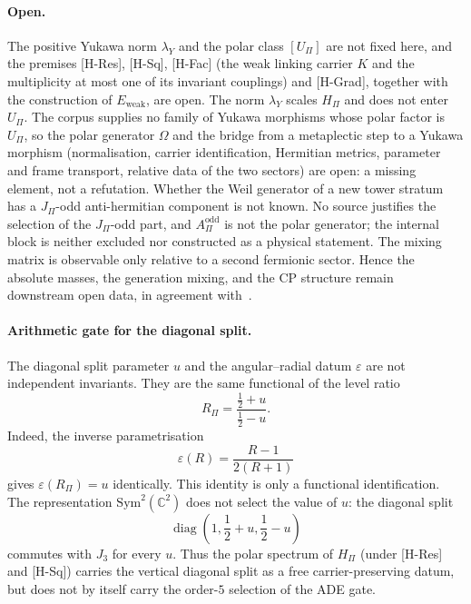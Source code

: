 \documentclass[11pt]{article}
\theoremstyle{definition}
\theoremstyle{remark}
\newcommand{\JPi}{J_{\Pi}}
\newcommand{\Jthree}{J_{3}}
\newcommand{\Eweak}{E_{\mathrm{weak}}}
\newcommand{\Hpi}{H_{\Pi}}
\newcommand{\Upi}{U_{\Pi}}
\newcommand{\Opol}{\Omega}
\newcommand{\Aodd}{A_{\Pi}^{\mathrm{odd}}}
\newcommand{\lamY}{\lambda_{Y}}
\newcommand{\Sym}{\mathrm{Sym}}
\newcommand{\diag}{\operatorname{diag}}
\begin{document}
    \paragraph{Open.}
      The positive Yukawa norm $\lamY$ and the polar class $[\Upi]$ are not fixed here, and the
      premises [H-Res], [H-Sq], [H-Fac] (the weak linking carrier $K$ and the multiplicity at most one of its invariant
      couplings) and [H-Grad], together with the construction of $\Eweak$, are open.
      The norm $\lamY$ scales $\Hpi$ and does not enter $\Upi$.
      The corpus supplies no family of Yukawa morphisms whose polar factor is $\Upi$, so the polar generator $\Opol$
      and the bridge from a metaplectic step to a Yukawa morphism (normalisation, carrier identification, Hermitian
      metrics, parameter and frame transport, relative data of the two sectors) are open: a missing element, not a
      refutation.
      Whether the Weil generator of a new tower stratum has a $\JPi$-odd anti-hermitian component is not known.
      No source justifies the selection of the $\JPi$-odd part, and $\Aodd$ is not the polar generator; the internal
      block is neither excluded nor constructed as a physical statement.
      The mixing matrix is observable only relative to a second fermionic sector.
      Hence the absolute masses, the generation mixing, and the CP structure remain downstream open data, in
      agreement with~\cite{Beau2026fmnote}.

    \paragraph{Arithmetic gate for the diagonal split.}
      The diagonal split parameter \(u\) and the angular--radial datum \(\varepsilon\) are not
      independent invariants.
      They are the same functional of the level ratio
      \[
        R_\Pi
        =
        \frac{\frac12+u}{\frac12-u}.
      \]
      Indeed, the inverse parametrisation
      \[
        \varepsilon(R)
        =
        \frac{R-1}{2(R+1)}
      \]
      gives \(\varepsilon(R_\Pi)=u\) identically.
      This identity is only a functional identification.
      The representation \(\Sym^{2}(\mathbb{C}^{2})\) does not select the value of \(u\):
      the diagonal split
      \[
        \diag\left(1,\frac12+u,\frac12-u\right)
      \]
      commutes with \(\Jthree\) for every \(u\).
      Thus the polar spectrum of \(\Hpi\) (under [H-Res] and [H-Sq]) carries the vertical diagonal split as a free
      carrier-preserving datum, but does not by itself carry the order-\(5\) selection of the ADE
      gate.
\end{document}
